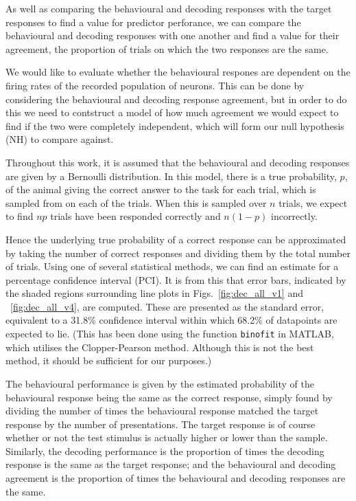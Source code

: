 As well as comparing the behavioural and decoding responses with the target responses to find a value for predictor perforance, we can compare the behavioural and decoding responses with one another and find a value for their agreement, the proportion of trials on which the two responses are the same.

We would like to evaluate whether the behavioural respones are dependent on the firing rates of the recorded population of neurons. This can be done by considering the behavioural and decoding response agreement, but in order to do this we need to contstruct a model of how much agreement we would expect to find if the two were completely independent, which will form our null hypothesis (NH) to compare against.

Throughout this work, it is assumed that the behavioural and decoding responses are given by a Bernoulli distribution. In this model, there is a true probability, $p$, of the animal giving the correct answer to the task for each trial, which is sampled from on each of the trials. When this is sampled over $n$ trials, we expect to find $np$ trials have been responded correctly and $n(1-p)$ incorrectly.

Hence the underlying true probability of a correct response can be approximated by taking the number of correct responses and dividing them by the total number of trials. Using one of several statistical methods, we can find an estimate for a percentage confidence interval (PCI).
It is from this that error bars, indicated by the shaded regions surrounding line plots in Figs.~\ref{fig:dec_all_v1} and ~\ref{fig:dec_all_v4}, are computed. These are presented as the standard error, equivalent to a 31.8\%  confidence interval within which 68.2\% of datapoints are expected to lie. (This has been done using the function \texttt{binofit} in MATLAB, which utilises the Clopper-Pearson method. Although this is not the best method, it should be sufficient for our purposes.)

The behavioural performance is given by the estimated probability of the behavioural response being the same as the correct response, simply found by dividing the number of times the behavioural response matched the target response by the number of presentations.
The target response is of course whether or not the test stimulus is actually higher or lower than the sample. Similarly, the decoding performance is the proportion of times the decoding response is the same as the target response; and the behavioural and decoding agreement is the proportion of times the behavioural and decoding responses are the same.

